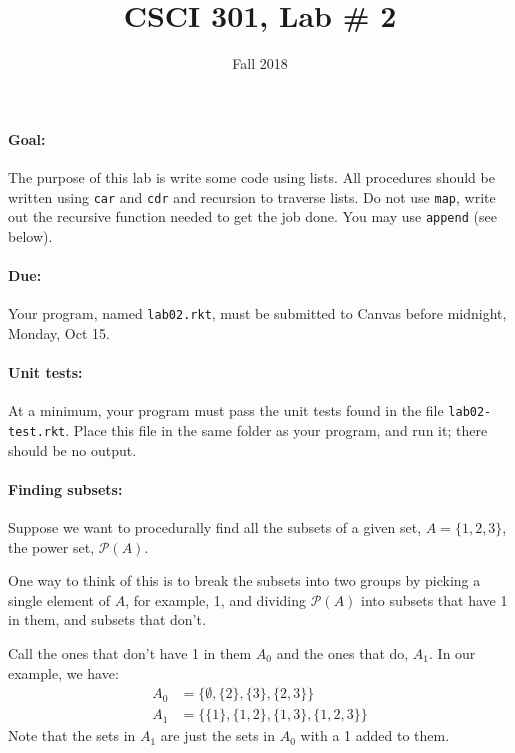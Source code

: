 \documentclass{article}
\title{CSCI 301, Lab \# 2}
\author{Fall 2018}
\date{}
\newcommand{\set}[1]{\ensuremath{\{#1\}}}
\newcommand{\power}[1]{\ensuremath{\mathcal{P}(#1)}}
\begin{document}
\maketitle


\paragraph{Goal:} The purpose of this lab is write some  code 
 using lists.  All procedures should be written using {\tt car} and
 {\tt cdr} and recursion to traverse lists.  Do not use {\tt map},
 write out the recursive function needed to get the job done.  You may
 use {\tt append} (see below).

\paragraph{Due:} Your program, named {\tt lab02.rkt}, must be submitted to
  Canvas before midnight, Monday, Oct 15.

  \paragraph{Unit tests:}
  At a minimum, your program must pass the unit tests found in the
  file {\tt lab02-test.rkt}.  Place this file in the same folder
  as your program, and run it;  there should be no output.

\paragraph{Finding subsets:}  Suppose we want to procedurally find all
the subsets of a given set, $A=\set{1,2,3}$, the power set,
$\mathcal{P}(A)$.

One way to think of this is to break the subsets
into two groups by picking a single element of $A$, for example, 1,
and dividing \power{A} into subsets that have 1 in them, and subsets that
don't.

Call the ones that don't have 1 in them $A_0$ and the ones
that do, $A_1$.  In our example, we have:
\begin{align*}
A_0 &= \set{\emptyset,\set{2},\set{3},\set{2,3}}\\
A_1 &= \set{\set{1},\set{1,2},\set{1,3},\set{1,2,3}}
\end{align*}
Note that the sets in $A_1$ are just the sets in $A_0$ with a 1 added
to them.
\end{document}
